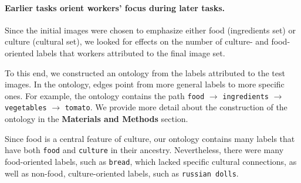 \documentclass[letterpaper]{article}
\begin{document}
\paragraph{Earlier tasks orient workers' focus during later tasks.} 
Since the initial images were chosen to emphasize either food (ingredients set)
or culture (cultural set), we looked for effects on the number of culture- and 
food-oriented labels that workers attributed to the final image set.

To this end, we constructed an ontology from the labels attributed to the 
test images.  In the ontology, edges point from more general labels to more 
specific ones.  For example, the ontology contains the path \texttt{food} 
$\to$ \texttt{ingredients} $\to$ \texttt{vegetables} $\to$ \texttt{tomato}.
We provide more detail about the construction of the ontology in the 
\textbf{Materials and Methods} section.

Since food is a central feature 
of culture, our ontology contains many labels that have both \texttt{food}
and \texttt{culture} in their ancestry.  Nevertheless, there were many 
food-oriented labels, such as \texttt{bread}, which lacked specific cultural 
connections, as well as non-food, culture-oriented labels, such as 
\texttt{russian dolls}. 
\end{document}

